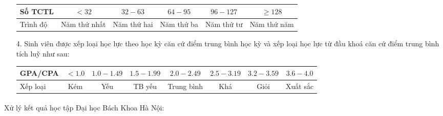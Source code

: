 \begin{itemize}
\begin{table}[h!]
\begin{tabular}{|l|c|c|c|c|c|}
          \hline
          Số TCTL  & $<32$        & $32-63$     & $64-95$    & $96-127$   & $\geq 128$  \\
          \hline
          Trình độ & Năm thứ nhất & Năm thứ hai & Năm thứ ba & Năm thứ tư & Năm thứ năm \\
          \hline
        \end{tabular}   
    \end{table}	
	\item[4.] Sinh viên được xếp loại học lực theo học kỳ căn cứ điểm trung bình học kỳ và xếp loại học lực từ đầu khoá căn cứ điểm trung bình tích luỹ như sau:
    \begin{table}[h!]
      \begin{tabular}{|l|c|c|c|c|c|c|c|}
          \hline
          GPA/CPA  & $<1.0$ & $1.0-1.49$ & $1.5-1.99$ & $2.0-2.49$ & $2.5-3.19$ & $3.2-3.59$ & $3.6-4.0$ \\
          \hline
          Xếp loại & Kém    & Yếu        & TB yếu     & Trung bình & Khá        & Giỏi       & Xuất sắc  \\
          \hline
        \end{tabular}
    \end{table}	
\end{itemize}

\noindent Xử lý kết quả học tập Đại học Bách Khoa Hà Nội:\textsuperscript{\cite{daotao}}\\

